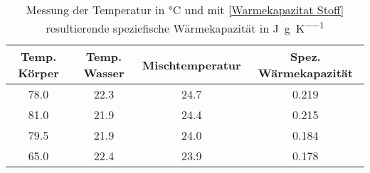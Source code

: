 \begin{center}
\begin{table}
\begin{tabular}{c | c | c | c}
	Temp. Körper & Temp. Wasser & Mischtemperatur & Spez. Wärmekapazität \\
	\hline
	78.0 & 22.3 & 24.7 & 0.219 \\
	81.0 & 21.9 & 24.4 & 0.215 \\
	79.5 & 21.9 & 24.0 & 0.184 \\
	65.0 & 22.4 & 23.9 & 0.178 \\
\end{tabular}
	\caption{Messung der Temperatur in \si{\celsius} und mit \eqref{Warmekapazitat Stoff} resultierende speziefische Wärmekapazität in \si{\joule\per\gram\per\kelvin}}
\end{table}
\end{center}